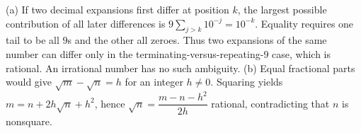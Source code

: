 (a) If two decimal expansions first differ at position $k$, the largest possible contribution of all later differences is $9\sum_{j>k}10^{-j}=10^{-k}$. Equality requires one tail to be all $9$s and the other all zeroes. Thus two expansions of the same number can differ only in the terminating-versus-repeating-$9$ case, which is rational. An irrational number has no such ambiguity.
(b) Equal fractional parts would give $\sqrt m-\sqrt n=h$ for an integer $h\ne0$. Squaring yields $m=n+2h\sqrt n+h^2$, hence $\sqrt n=\dfrac{m-n-h^2}{2h}$ rational, contradicting that $n$ is nonsquare.
